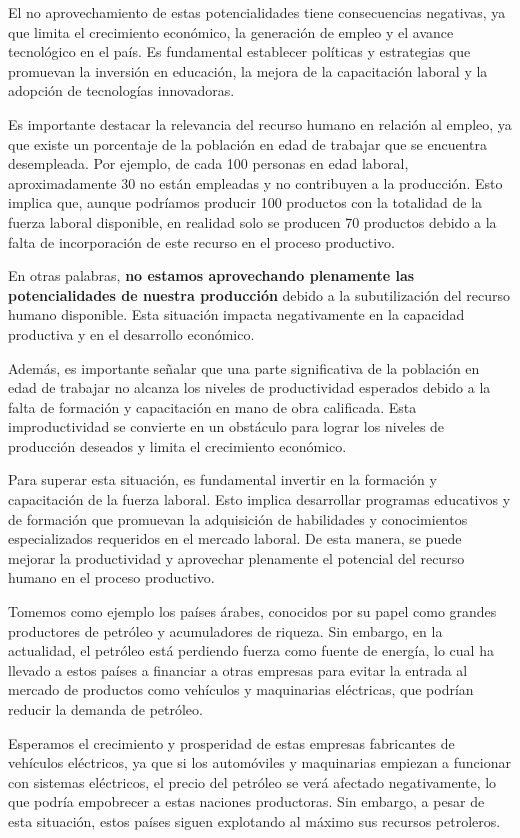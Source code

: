 \documentclass[
  a4paper,
]{article}
\begin{document}
El no aprovechamiento de estas potencialidades tiene consecuencias
negativas, ya que limita el crecimiento económico, la generación de
empleo y el avance tecnológico en el país. Es fundamental establecer
políticas y estrategias que promuevan la inversión en educación, la
mejora de la capacitación laboral y la adopción de tecnologías
innovadoras.

Es importante destacar la relevancia del recurso humano en relación al
empleo, ya que existe un porcentaje de la población en edad de trabajar
que se encuentra desempleada. Por ejemplo, de cada 100 personas en edad
laboral, aproximadamente 30 no están empleadas y no contribuyen a la
producción. Esto implica que, aunque podríamos producir 100 productos
con la totalidad de la fuerza laboral disponible, en realidad solo se
producen 70 productos debido a la falta de incorporación de este recurso
en el proceso productivo.

En otras palabras, \textbf{no estamos aprovechando plenamente las
potencialidades de nuestra producción} debido a la subutilización del
recurso humano disponible. Esta situación impacta negativamente en la
capacidad productiva y en el desarrollo económico.

Además, es importante señalar que una parte significativa de la
población en edad de trabajar no alcanza los niveles de productividad
esperados debido a la falta de formación y capacitación en mano de obra
calificada. Esta improductividad se convierte en un obstáculo para
lograr los niveles de producción deseados y limita el crecimiento
económico.

Para superar esta situación, es fundamental invertir en la formación y
capacitación de la fuerza laboral. Esto implica desarrollar programas
educativos y de formación que promuevan la adquisición de habilidades y
conocimientos especializados requeridos en el mercado laboral. De esta
manera, se puede mejorar la productividad y aprovechar plenamente el
potencial del recurso humano en el proceso productivo.

Tomemos como ejemplo los países árabes, conocidos por su papel como
grandes productores de petróleo y acumuladores de riqueza. Sin embargo,
en la actualidad, el petróleo está perdiendo fuerza como fuente de
energía, lo cual ha llevado a estos países a financiar a otras empresas
para evitar la entrada al mercado de productos como vehículos y
maquinarias eléctricas, que podrían reducir la demanda de petróleo.

Esperamos el crecimiento y prosperidad de estas empresas fabricantes de
vehículos eléctricos, ya que si los automóviles y maquinarias empiezan a
funcionar con sistemas eléctricos, el precio del petróleo se verá
afectado negativamente, lo que podría empobrecer a estas naciones
productoras. Sin embargo, a pesar de esta situación, estos países siguen
explotando al máximo sus recursos petroleros.
\end{document}
